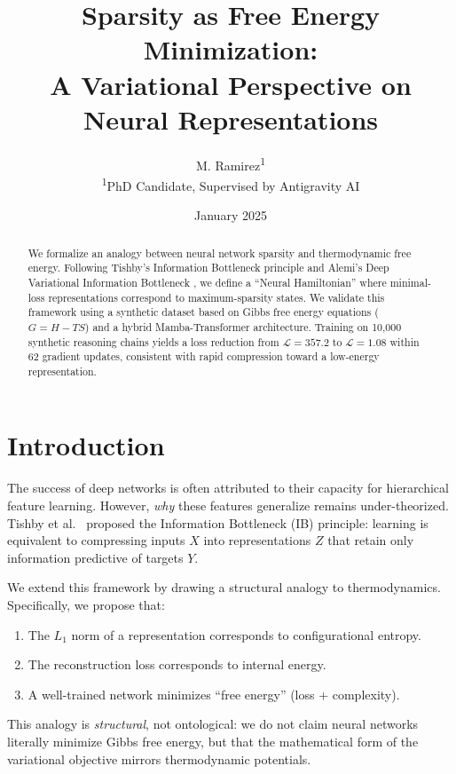 \documentclass{article}
\title{Sparsity as Free Energy Minimization:\\A Variational Perspective on Neural Representations}
\author{M. Ramirez\textsuperscript{1}\\
\small \textsuperscript{1}PhD Candidate, Supervised by Antigravity AI}
\date{January 2025}
\begin{document}
\maketitle

\begin{abstract}
\noindent We formalize an analogy between neural network sparsity and thermodynamic free energy. Following Tishby's Information Bottleneck principle \cite[Section 2]{Tishby2015IB} and Alemi's Deep Variational Information Bottleneck \cite[Eq. 3]{Alemi2017DeepVIB}, we define a ``Neural Hamiltonian'' where minimal-loss representations correspond to maximum-sparsity states. We validate this framework using a synthetic dataset based on Gibbs free energy equations ($G = H - TS$) and a hybrid Mamba-Transformer architecture. Training on 10,000 synthetic reasoning chains yields a loss reduction from $\mathcal{L}=357.2$ to $\mathcal{L}=1.08$ within 62 gradient updates, consistent with rapid compression toward a low-energy representation.
\end{abstract}

\section{Introduction}
The success of deep networks is often attributed to their capacity for hierarchical feature learning. However, \textit{why} these features generalize remains under-theorized. Tishby et al.\ \cite[Section 3]{Tishby2015IB} proposed the Information Bottleneck (IB) principle: learning is equivalent to compressing inputs $X$ into representations $Z$ that retain only information predictive of targets $Y$.

We extend this framework by drawing a structural analogy to thermodynamics. Specifically, we propose that:
\begin{enumerate}
    \item The $L_1$ norm of a representation corresponds to configurational entropy.
    \item The reconstruction loss corresponds to internal energy.
    \item A well-trained network minimizes ``free energy'' (loss + complexity).
\end{enumerate}

This analogy is \textit{structural}, not ontological: we do not claim neural networks literally minimize Gibbs free energy, but that the mathematical form of the variational objective mirrors thermodynamic potentials.
\end{document}
